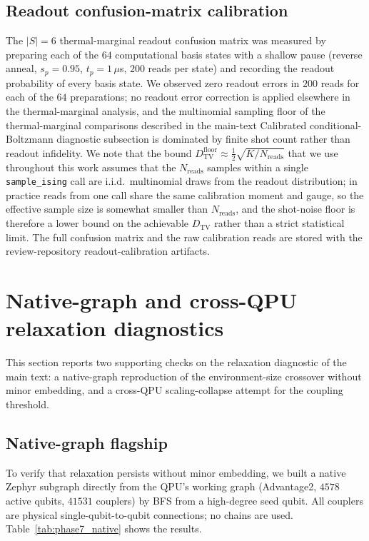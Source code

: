 \documentclass[aps,prapplied,reprint,superscriptaddress,floatfix,nofootinbib]{revtex4-2}
\begin{document}
\subsection{Readout confusion-matrix calibration}
\label{sec:phase6_readout}

The $|S|=6$ thermal-marginal readout confusion matrix was measured by preparing
each of the $64$ computational basis states with a shallow pause
(reverse anneal, $s_p=0.95$, $t_p=1\,\mu$s, $200$ reads per state) and
recording the readout probability of every basis state.  We observed
zero readout errors in $200$ reads for each of the $64$ preparations;
no readout error correction is applied elsewhere in
the thermal-marginal analysis, and the multinomial sampling floor of
the thermal-marginal comparisons described in the main-text Calibrated conditional-Boltzmann diagnostic subsection is dominated by finite
shot count rather than readout infidelity.  We note that the bound $D_\mathrm{TV}^\mathrm{floor}\approx\tfrac{1}{2}\sqrt{K/N_\mathrm{reads}}$ that we use throughout this work assumes that the $N_\mathrm{reads}$ samples within a single \texttt{sample\_ising} call are i.i.d.\ multinomial draws from the readout distribution; in practice reads from one call share the same calibration moment and gauge, so the effective sample size is somewhat smaller than $N_\mathrm{reads}$, and the shot-noise floor is therefore a lower bound on the achievable $D_\mathrm{TV}$ rather than a strict statistical limit.  The full confusion matrix
and the raw calibration reads are stored with the review-repository
readout-calibration artifacts.

\section{Native-graph and cross-QPU relaxation diagnostics}
\label{sec:native_crossqpu}

This section reports two supporting checks on the relaxation diagnostic of the main text: a native-graph reproduction of the environment-size crossover without minor embedding, and a cross-QPU scaling-collapse attempt for the coupling threshold.

\subsection{Native-graph flagship}
\label{sec:phase7_native}

To verify that relaxation persists without minor embedding, we built
a native Zephyr subgraph directly from the QPU's working graph
(Advantage2, $4578$ active qubits, $41531$ couplers) by BFS from a
high-degree seed qubit.  All couplers are physical single-qubit-to-qubit
connections; no chains are used.  Table~\ref{tab:phase7_native} shows
the results.
\end{document}
